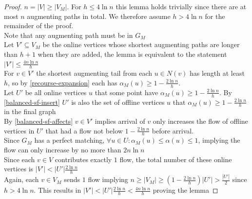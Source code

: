 \begin{proof}
	$n=|V|\geq|V_M|$. For $h\leq 4\ln n$ this lemma holds trivially since there are at most $n$ augmenting paths in total. We therefore assume $h>4\ln n$ for the remainder of the proof.\\
	Note that any augmenting path must be in $G_M$\\
	Let $V'\subseteq V_M$ be the online vertices whose shortest augmenting paths are longer than $h+1$ when they are added, the lemma is equivalent to the statement $|V'|\leq \frac{4n\ln n}{h}$\\
	For $v\in V'$ the shortest augmenting tail from each $u\in N(v)$ has length at least $h$, so by \autoref{recourse-expansion} each has $\alpha_M(u)\geq 1-\frac{2\ln n}{h}$.\\
	Let $U'$ be all online vertices $u$ that some point have $\alpha_M(u)\geq1-\frac{2\ln n}{h}$. By \autoref{balanced-sf-insert} $U'$ is also the set of offline vertices $u$ that $\alpha_M(u)\geq1-\frac{2\ln n}{h}$ in the final graph\\
	By \autoref{balanced-sf-affects} $v\in V'$ implies arrival of $v$ only increases the flow of offline vertices in $U'$ that had a flow not below $1-\frac{2\ln n}{h}$ before arrival.\\
	Since $G_M$ has a perfect matching, $\forall u\in U:\alpha_M(u)\leq\alpha(u)\leq 1$, implying the flow can only increase by no more than $2n\ln n$\\
	Since each $v\in V$ contributes exactly $1$ flow, the total number of these online vertices is $|V'|<|U'|\frac{2\ln n}{h}$\\
	Again, each $v\in V_M$ sends $1$ flow implying $n\geq|V_M|\geq(1-\frac{2\ln n}{h})|U'|>\frac{|U'|}{2}$ since $h>4\ln n$.
	This results in $|V'|<|U'|\frac{2\ln n}{h}<\frac{4n\ln n}{h}$ proving the lemma
\end{proof}